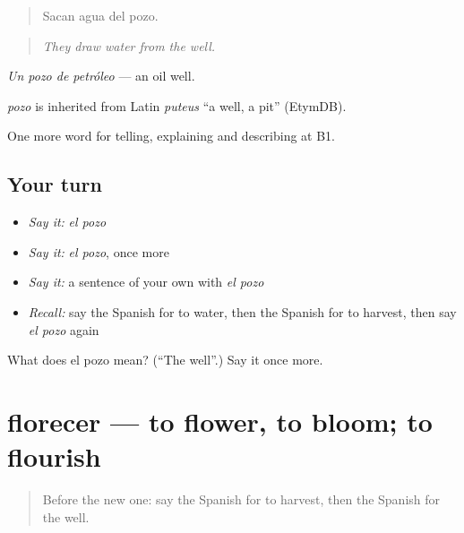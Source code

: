 \begin{quote}
Sacan agua del pozo.
\end{quote}

\begin{quote}
\emph{They draw water from the well.}
\end{quote}

\emph{Un pozo de petróleo} — an oil well.

\begin{cousinweb}
\emph{pozo} is inherited from Latin \emph{puteus} \textquotedblleft{}a well, a pit\textquotedblright{} (EtymDB).
\end{cousinweb}

\begin{grammarlens}[title={What you've built}]
One more word for telling, explaining and describing at B1.
\end{grammarlens}

\subsection*{Your turn}
\begin{itemize}
\raggedright
  \item \emph{Say it:} \emph{el pozo}
  \item \emph{Say it:} \emph{el pozo}, once more
  \item \emph{Say it:} a sentence of your own with \emph{el pozo}
  \item \emph{Recall:} say the Spanish for to water, then the Spanish for to harvest, then say \emph{el pozo} again
\end{itemize}

\begin{tcolorbox}[breakable,colback=teal!4,colframe=teal!35!black,title={Before you move on}]
What does el pozo mean? (\textquotedblleft{}The well\textquotedblright{}.) Say it once more.
\end{tcolorbox}
\section[florecer]{florecer — to flower, to bloom; to flourish}

\label{lesson:ES-C692-florecer}



\begin{quote}
Before the new one: say the Spanish for to harvest, then the Spanish for the well.
\end{quote}

